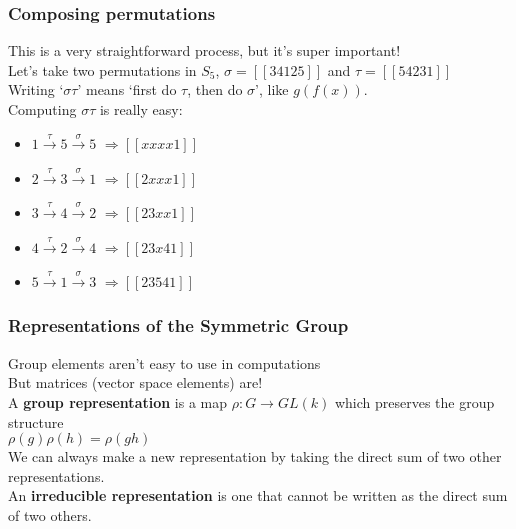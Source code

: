\documentclass{beamer} %
\theoremstyle{definition} %
\def \pausenl {\pause $ \ $\\}
\begin{document}
\begin{frame}
	\frametitle{Composing permutations}
	This is a very straightforward process, but it's super important!\\
	\pausenl
	
	Let's take two permutations in $S_5$, $\sigma=[[34125]]$ and $\tau = [[54231]]$\\
	\pausenl
	Writing `$\sigma \tau$' means `first do $\tau$, then do $\sigma$', like $g(f(x))$.\\
	
	\pausenl
	
	Computing $\sigma\tau$ is really easy:\\
	\pause
	\begin{itemize}
		\item $1\xrightarrow{\tau} 5 \xrightarrow{\sigma} 5$ \pause $\Rightarrow [[xxxx1]]$
		\pause
		\item $2\xrightarrow{\tau} 3 \xrightarrow{\sigma} 1$ \pause $\Rightarrow [[2xxx1]]$
		\pause
		\item $3\xrightarrow{\tau} 4 \xrightarrow{\sigma} 2$ \pause $\Rightarrow [[23xx1]]$
		\pause
		\item $4 \xrightarrow{\tau} 2 \xrightarrow{\sigma} 4$ \pause $\Rightarrow [[23x41]]$
		\pause
		\item $5 \xrightarrow{\tau} 1 \xrightarrow{\sigma} 3$ \pause $\Rightarrow [[23541]]$
	\end{itemize}
	
	
\end{frame}

\begin{frame}
	\frametitle{Representations of the Symmetric Group}
	\pause
	Group elements aren't easy to use in computations\\
	\pausenl
	But matrices (vector space elements) are!\\
	
	\pausenl
	
	A \textbf{group representation} is a map $\rho: G \rightarrow GL(k)$ which preserves the group structure\\
	$\rho(g)\rho(h)=\rho(gh)$\\
	\pausenl
	
	We can always make a new representation by taking the direct sum of two other representations.\\
	\pause
	An \textbf{irreducible representation} is one that cannot be written as the direct sum of two others.
\end{frame}
\end{document}
